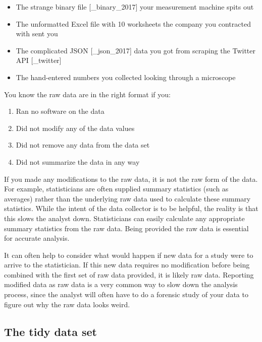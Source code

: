 \documentclass[12pt]{article}
\providecommand{\tightlist}{%
  \setlength{\itemsep}{0pt}\setlength{\parskip}{0pt}}
\begin{document}
\begin{itemize}
\tightlist
\item
  The strange binary file {[}\_binary\_2017{]} your measurement machine
  spits out
\item
  The unformatted Excel file with 10 worksheets the company you
  contracted with sent you
\item
  The complicated JSON {[}\_json\_2017{]} data you got from scraping the
  Twitter API {[}\_twitter{]}
\item
  The hand-entered numbers you collected looking through a microscope
\end{itemize}

You know the raw data are in the right format if you:

\begin{enumerate}
\def\labelenumi{\arabic{enumi}.}
\tightlist
\item
  Ran no software on the data
\item
  Did not modify any of the data values
\item
  Did not remove any data from the data set
\item
  Did not summarize the data in any way
\end{enumerate}

If you made any modifications to the raw data, it is not the raw form of
the data. For example, statisticians are often supplied summary
statistics (such as averages) rather than the underlying raw data used
to calculate these summary statistics. While the intent of the data
collector is to be helpful, the reality is that this slows the analyst
down. Statisticians can easily calculate any appropriate summary
statistics from the raw data. Being provided the raw data is essential
for accurate analysis.

It can often help to consider what would happen if new data for a study
were to arrive to the statistician. If this new data requires no
modification before being combined with the first set of raw data
provided, it is likely raw data. Reporting modified data as raw data is
a very common way to slow down the analysis process, since the analyst
will often have to do a forensic study of your data to figure out why
the raw data looks weird.

\subsection{The tidy data set}
\label{sec:tidydata}
\end{document}
